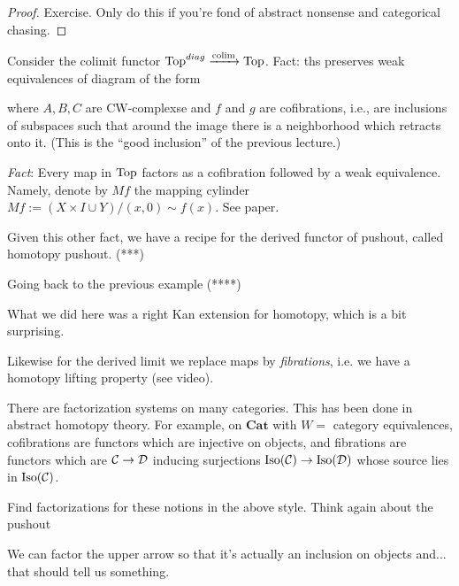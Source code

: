 \documentclass[../MH_Total.tex]{subfiles}
\begin{document}
\begin{proof}
	Exercise. Only do this if you're fond of abstract nonsense and categorical chasing.
\end{proof}

\begin{example}
	Consider the colimit functor $\operatorname{Top}^{diag} \xrightarrow{\operatorname{colim}}\operatorname{Top}$. Fact: ths preserves weak equivalences of diagram of the form
	\begin{center}
	\end{center}
	where $A,B,C$ are CW-complexse and $f$ and $g$ are cofibrations, i.e., are inclusions of subspaces such that around the image there is a neighborhood which retracts onto it. (This is the ``good inclusion'' of the previous lecture.)
\end{example}

\emph{Fact}: Every map in $\operatorname{Top}$ factors as a cofibration followed by a weak equivalence. Namely, denote by $Mf$ the mapping cylinder $Mf := (X \times I \cup Y)/(x,0) \sim f(x)$. See paper.

Given this other fact, we have a recipe for the derived functor of pushout, called homotopy pushout. (***)

Going back to the previous example (****)

What we did here was a right Kan extension for homotopy, which is a bit surprising.

Likewise for the derived limit we replace maps by \emph{fibrations}, i.e. we have a homotopy lifting property (see video).

There are factorization systems on many categories. This has been done in abstract homotopy theory. For example, on $\mathbf{Cat}$ with $W =$ category equivalences, cofibrations are functors which are injective on objects, and fibrations are functors which are $\mathcal{C} \to \mathcal{D}$ inducing surjections $\operatorname{Iso}(\mathcal{C}) \to \operatorname{Iso}(\mathcal{D})$ whose source lies in $\operatorname{Iso}(\mathcal{C})$. 

\begin{exercise}
	Find factorizations for these notions in the above style. Think again about the pushout 
		\begin{center}
	\end{center}
	We can factor the upper arrow so that it's actually an inclusion on objects and... that should tell us something.
\end{exercise}
\end{document}
